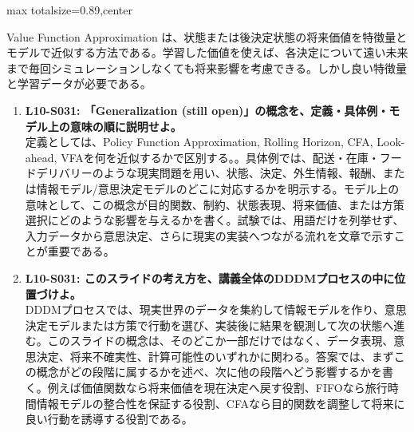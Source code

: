\begin{minipage}[t]{0.58\textwidth}
\begin{adjustbox}{max totalsize={\textwidth}{0.89\textheight},center}
\begin{minipage}{\textwidth}
Value Function Approximation は、状態または後決定状態の将来価値を特徴量とモデルで近似する方法である。学習した価値を使えば、各決定について遠い未来まで毎回シミュレーションしなくても将来影響を考慮できる。しかし良い特徴量と学習データが必要である。\par{}\begin{enumerate}\item \textbf{L10-S031: 「Generalization (still open)」の概念を、定義・具体例・モデル上の意味の順に説明せよ。}\\定義としては、Policy Function Approximation, Rolling Horizon, CFA, Look-ahead, VFAを何を近似するかで区別する。。具体例では、配送・在庫・フードデリバリーのような現実問題を用い、状態、決定、外生情報、報酬、または情報モデル/意思決定モデルのどこに対応するかを明示する。モデル上の意味として、この概念が目的関数、制約、状態表現、将来価値、または方策選択にどのような影響を与えるかを書く。試験では、用語だけを列挙せず、入力データから意思決定、さらに現実の実装へつながる流れを文章で示すことが重要である。\item \textbf{L10-S031: このスライドの考え方を、講義全体のDDDMプロセスの中に位置づけよ。}\\DDDMプロセスでは、現実世界のデータを集約して情報モデルを作り、意思決定モデルまたは方策で行動を選び、実装後に結果を観測して次の状態へ進む。このスライドの概念は、そのどこか一部だけではなく、データ表現、意思決定、将来不確実性、計算可能性のいずれかに関わる。答案では、まずこの概念がどの段階に属するかを述べ、次に他の段階へどう影響するかを書く。例えば価値関数なら将来価値を現在決定へ戻す役割、FIFOなら旅行時間情報モデルの整合性を保証する役割、CFAなら目的関数を調整して将来に良い行動を誘導する役割である。\end{enumerate}
\end{minipage}
\end{adjustbox}
\end{minipage}


